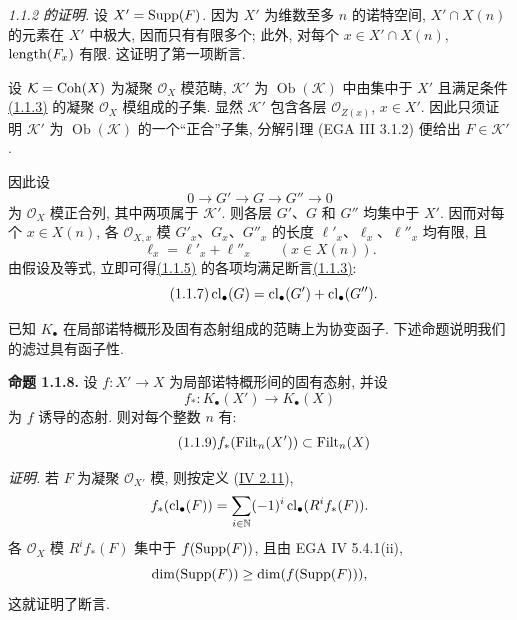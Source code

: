\emph{1.1.2 的证明.} 设 $X'=\operatorname{Supp}(F)$. 因为 $X'$ 为维数至多 $n$ 的诺特空间, $X'\cap X(n)$ 的元素在 $X'$ 中极大, 因而只有有限多个; 此外, 对每个 $x\in X'\cap X(n)$, $\operatorname{length}(F_x)$ 有限. 这证明了第一项断言.
%
%
%
%

设 $\mathcal K=\operatorname{Coh}(X)$ 为凝聚 $\mathcal O_X$ 模范畴, $\mathcal K'$ 为 $\operatorname{Ob}(\mathcal K)$ 中由集中于 $X'$ 且满足条件\hyperlink{sga6.e10.eq.1-1-3}{(1.1.3)} 的凝聚 $\mathcal O_X$ 模组成的子集. 显然 $\mathcal K'$ 包含各层 $\mathcal O_{Z(x)}$, $x\in X'$. 因此只须证明 $\mathcal K'$ 为 $\operatorname{Ob}(\mathcal K)$ 的一个“正合”子集, 分解引理 (EGA III 3.1.2) 便给出 $F\in\mathcal K'$.
%
%
%
%
%
%

因此设
\begin{equation}\tag{1.1.5}
0\longrightarrow G'\longrightarrow G\longrightarrow G''\longrightarrow0
\end{equation}
为 $\mathcal O_X$ 模正合列, 其中两项属于 $\mathcal K'$. 则各层 $G'$、$G$ 和 $G''$ 均集中于 $X'$. 因而对每个
%
%
%
$x\in X(n)$, 各 $\mathcal O_{X,x}$ 模 $G'_x$、$G_x$、$G''_x$ 的长度 $\ell'_x$、$\ell_x$、$\ell''_x$ 均有限, 且
\begin{equation}\tag{1.1.6}
\ell_x=\ell'_x+\ell''_x\qquad(x\in X(n)).
\end{equation}
由假设及等式, 立即可得\hyperlink{sga6.e10.eq.1-1-5}{(1.1.5)} 的各项均满足断言\hyperlink{sga6.e10.eq.1-1-3}{(1.1.3)}:
%
\begin{equation}\tag{1.1.7}
\operatorname{cl}_\bullet(G)=\operatorname{cl}_\bullet(G')+\operatorname{cl}_\bullet(G'').
\end{equation}

已知 $K_\bullet$ 在局部诺特概形及固有态射组成的范畴上为协变函子. 下述命题说明我们的滤过具有函子性.
%
%

\textbf{命题 1.1.8.} 设 $f:X'\to X$ 为局部诺特概形间的固有态射, 并设
%
\[
f_*:K_\bullet(X')\longrightarrow K_\bullet(X)
\]
为 $f$ 诱导的态射. 则对每个整数 $n$ 有:
\begin{equation}\tag{1.1.9}
f_*(\operatorname{Filt}_n(X'))\subset\operatorname{Filt}_n(X)
\end{equation}
%

\emph{证明.} 若 $F$ 为凝聚 $\mathcal O_{X'}$ 模, 则按定义 (\hyperlink{sga6.e04.para.2-11}{IV 2.11}),
%
\[
f_*(\operatorname{cl}_\bullet(F))=
\sum_{i\in\mathbb N}(-1)^i\operatorname{cl}_\bullet(R^if_*(F)).
\]
各 $\mathcal O_X$ 模 $R^if_*(F)$ 集中于 $f(\operatorname{Supp}(F))$, 且由 EGA IV 5.4.1(ii),
%
\[
\dim(\operatorname{Supp}(F))\geq\dim(f(\operatorname{Supp}(F))),
\]
这就证明了断言.

